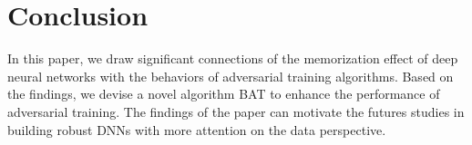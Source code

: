 \vspace{-0.4cm}
\section{Conclusion}
\vspace{-0.2cm}
In this paper, we draw significant connections of the memorization effect of deep neural networks with the behaviors of adversarial training algorithms. Based on the findings, we devise a novel algorithm BAT to enhance the performance of adversarial training. The findings of the paper can motivate the futures studies in building robust DNNs with more attention on the data perspective.
